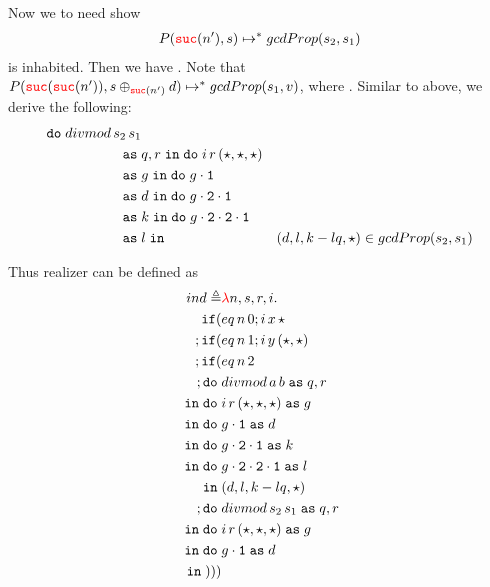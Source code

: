 \begin{enumerate}
\begin{itemize}
            Now we to need show 
            \begin{align*}
              P({\color{red}{\mathtt{suc}}}(n'),s) \mapsto^* gcdProp(s_2,s_1)
            \end{align*}
            is inhabited. Then we have 
            . 
            Note that $P({\color{red}{\mathtt{suc}}}({\color{red}{\mathtt{suc}}}(n')), s \oplus_{{\color{red}{\mathtt{suc}}}(n')} d) \mapsto^* 
            gcdProp(s_1,v)$, where .
            Similar to above, we derive the following:
            \begin{align*}
              \isComp{
                \bind{divmod\,s_2\,s_1\\}{&q,r}{
                \bind{i\, r\, (\triv,\triv,\triv)\\}{&g}{
              \bind{\fst{g}\\}{&d}{
                \bind{\fst{\snd{g}}\\}{&k}{
                  \bind{\fst{\snd{\snd{g}}}\\}{&l}{
                    &(d,l,k-lq,\triv)}}
              }}}}{gcdProp(s_2,s_1)}
            \end{align*}
        \end{itemize}
        Thus realizer can be defined as 
        \begin{align*}
          ind \triangleq &\lam{n,s,r,i}{}{\\
            \ifthen{&eq\,n\,0}{i\,x\,\triv\\}{
              \ifthen{&eq\,n\,1}{i\,y\,(\triv,\triv)\\}{
                \ifthen{&eq\,n\,2\\}{
                  \bind{&divmod\,a\,b}{q,r\\}{
                    \bind{&i\, r\, (\triv,\triv,\triv)}{g\\}{
                      \bind{&\fst{g}}{d\\}{
                        \bind{&\fst{\snd{g}}}{k\\}{
                          \bind{&\fst{\snd{\snd{g}}}}{l\\}{
                    &(d,l,k-lq,\triv)}}\\
              }}}
                    }{
                      \bind{&divmod\,s_2\,s_1}{q,r\\}{
                        \bind{&i\, r\, (\triv,\triv,\triv)}{g\\}{
                          \bind{&\fst{g}}{d\\}{
}}}}}}}
\end{align*}
\end{enumerate}
